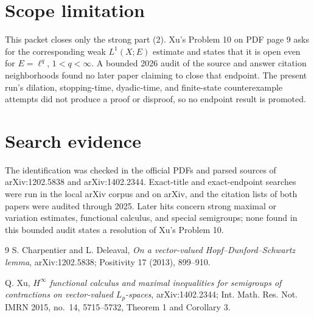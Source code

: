 \documentclass[11pt]{article}
\begin{document}
\section*{Scope limitation}

This packet closes only the strong part (2).  Xu's Problem 10 on PDF page 9
asks for the corresponding weak $L^1(X;E)$ estimate and states that it is open
even for $E=\ell^q$, $1<q<\infty$.  A bounded 2026 audit of the source and
answer citation neighborhoods found no later paper claiming to close that
endpoint.  The present run's dilation, stopping-time, dyadic-time, and
finite-state counterexample attempts did not produce a proof or disproof, so
no endpoint result is promoted.

\section*{Search evidence}

The identification was checked in the official PDFs and parsed sources of
arXiv:1202.5838 and arXiv:1402.2344.  Exact-title and exact-endpoint searches
were run in the local arXiv corpus and on arXiv, and the citation lists of both
papers were audited through 2025.  Later hits concern strong maximal or
variation estimates, functional calculus, and special semigroups; none found
in this bounded audit states a resolution of Xu's Problem 10.

\begin{thebibliography}{9}
S. Charpentier and L. Deleaval,
\emph{On a vector-valued Hopf--Dunford--Schwartz lemma},
arXiv:1202.5838; Positivity 17 (2013), 899--910.

Q. Xu,
\emph{$H^\infty$ functional calculus and maximal inequalities for semigroups
of contractions on vector-valued $L_p$-spaces},
arXiv:1402.2344; Int. Math. Res. Not. IMRN 2015, no.~14, 5715--5732,
Theorem 1 and Corollary 3.
\end{thebibliography}
\end{document}
